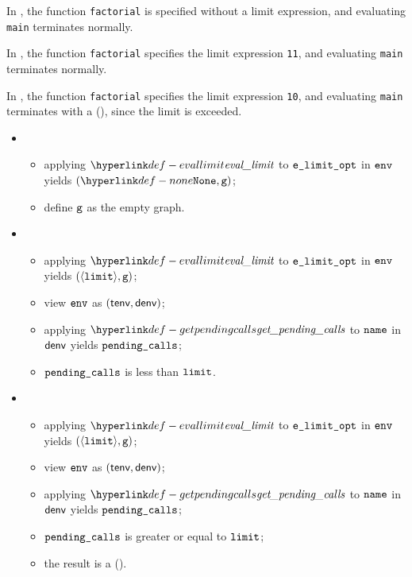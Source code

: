 In , the function \verb|factorial| is specified without a limit expression,
and evaluating \verb|main| terminates normally.

In , the function \verb|factorial| specifies the limit expression \verb|11|,
and evaluating \verb|main| terminates normally.

In , the function \verb|factorial| specifies the limit expression \verb|10|,
and evaluating \verb|main| terminates with a \dynamicerrorterm{} (\LimitExceeded), since the limit is exceeded.

\ProseParagraph
\OneApplies
\begin{itemize}
  \item {}
  \begin{itemize}
    \item applying $\evallimit$ to $\texttt{e\_limit\_opt}$ in $\texttt{env}$ yields $(\None, \vg)$\ProseOrDynErrorDiverging;
    \item define $\texttt{g}$ as the empty graph.
  \end{itemize}

  \item {}
  \begin{itemize}
    \item applying $\evallimit$ to $\texttt{e\_limit\_opt}$ in $\texttt{env}$ yields $(\langle\texttt{limit}\rangle, \texttt{g})$\ProseOrDynErrorDiverging;
    \item view $\texttt{env}$ as $(\textsf{tenv}, \textsf{denv})$;
    \item applying $\getpendingcalls$ to $\texttt{name}$ in $\textsf{denv}$ yields $\texttt{pending\_calls}$;
    \item $\texttt{pending\_calls}$ is less than $\texttt{limit}$.
  \end{itemize}

  \item {}
  \begin{itemize}
    \item applying $\evallimit$ to $\texttt{e\_limit\_opt}$ in $\texttt{env}$ yields $(\langle\texttt{limit}\rangle, \texttt{g})$\ProseOrDynErrorDiverging;
    \item view $\texttt{env}$ as $(\textsf{tenv}, \textsf{denv})$;
    \item applying $\getpendingcalls$ to $\texttt{name}$ in $\textsf{denv}$ yields $\texttt{pending\_calls}$;
    \item $\texttt{pending\_calls}$ is greater or equal to $\texttt{limit}$;
    \item the result is a \dynamicerrorterm{} (\LimitExceeded).
  \end{itemize}
\end{itemize}

